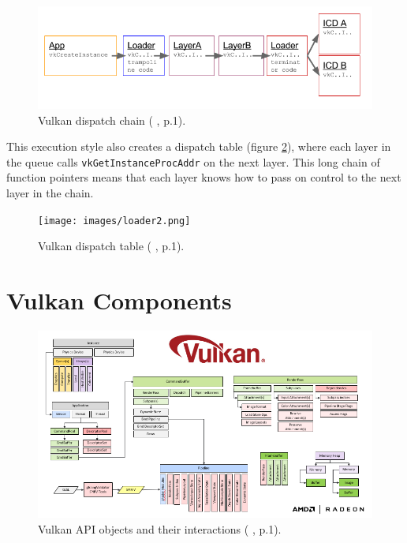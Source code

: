 \documentclass[12pt]{report}
\newcommand{\citediagram}[2]{(\citeauthor{#1} \citeyear{#1}, p.#2)}
\theoremstyle{definition}
\begin{document}
      \begin{figure}[h]
        \centering
        \includegraphics[width=\textwidth]{images/loader1.png}
        \caption{Vulkan dispatch chain \citediagram{renderdoc}{1}.}
        \label{fig:loader1}  
      \end{figure}

      This execution style also creates a dispatch table (figure \ref{fig:loader2}), where each layer in
      the queue calls \texttt{vkGetInstanceProcAddr} on the next layer. This long
      chain of function pointers means that each layer knows how to pass on
      control to the next layer in the chain. 


      \begin{figure}[h]
        \centering
        \texttt{[image: images/loader2.png]}
        \caption{Vulkan dispatch table \citediagram{renderdoc}{1}.}
        \label{fig:loader2}  
      \end{figure}

    \section{Vulkan Components}

      \begin{figure}[h]
        \centering
        \includegraphics[width=\textwidth]{images/interactions.png}
        \caption{Vulkan API objects and their interactions \citediagram{vez}{1}.}
        \label{fig:interactions}  
      \end{figure}
\end{document}
